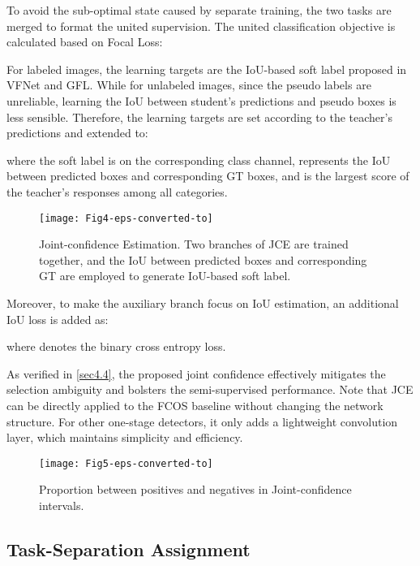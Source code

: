 \documentclass[10pt,twocolumn,letterpaper]{article}
\begin{document}
To avoid the sub-optimal state caused by separate training, the two tasks are merged to format the united supervision.
The united classification objective  is calculated based on Focal Loss:

For labeled images, the learning targets  are the IoU-based soft label proposed in VFNet\cite{VFL} and GFL\cite{GFL}.
While for unlabeled images, since the pseudo labels are unreliable, learning the IoU between student's predictions and pseudo boxes is less sensible.
Therefore, the learning targets  are set according to the teacher's predictions and extended to:

where the soft label is on the corresponding class channel,  represents the IoU between predicted boxes and corresponding GT boxes, and  is the largest score of the teacher's responses among all categories.


\begin{figure}[t]
    \centering
    \setlength{\abovecaptionskip}{5pt}
    \setlength{\belowcaptionskip}{-10pt}
    \texttt{[image: Fig4-eps-converted-to]}
    \caption{Joint-confidence Estimation. Two branches of JCE are trained together, and the IoU between predicted boxes and corresponding GT are employed to generate IoU-based soft label.}
    \label{fig4}
\end{figure}


Moreover, to make the auxiliary branch focus on IoU estimation, an additional IoU loss  is added as:

where  denotes the binary cross entropy loss.

As verified in \cref{sec4.4}, the proposed joint confidence effectively mitigates the selection ambiguity and bolsters the semi-supervised performance.
Note that JCE can be directly applied to the FCOS baseline without changing the network structure.
For other one-stage detectors, it only adds a lightweight  convolution layer, which maintains simplicity and efficiency.


\begin{figure}[t]
    \centering
    \setlength{\abovecaptionskip}{0pt}
    \setlength{\belowcaptionskip}{-10pt}
    \texttt{[image: Fig5-eps-converted-to]}
    \caption{Proportion between positives and negatives in Joint-confidence intervals.}
    \label{fig5}
\end{figure}


\subsection{Task-Separation Assignment}
\label{sec3.4}
\end{document}
